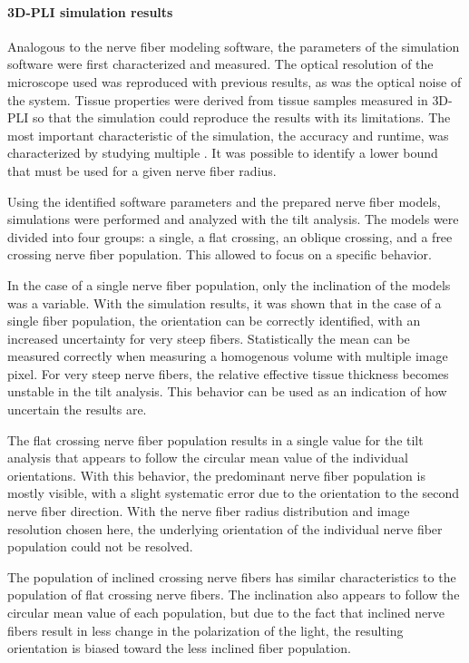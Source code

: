 \paragraph{\acs{3D-PLI} simulation results}
%
Analogous to the nerve fiber modeling software, the parameters of the simulation software were first characterized and measured.
The optical resolution of the microscope used was reproduced with previous results, as was the optical noise of the system.
Tissue properties were derived from tissue samples measured in \ac{3D-PLI} so that the simulation could reproduce the results with its limitations.
The most important characteristic of the simulation, the accuracy and runtime, was characterized by studying multiple \Voxelsize{}.
It was possible to identify a lower bound that must be used for a given nerve fiber radius.
\par
%
Using the identified software parameters and the prepared nerve fiber models, simulations were performed and analyzed with the tilt analysis.
The models were divided into four groups: a single, a flat crossing, an oblique crossing, and a free crossing nerve fiber population.
This allowed to focus on a specific behavior.
\par
%
In the case of a single nerve fiber population, only the inclination of the models was a variable.
With the simulation results, it was shown that in the case of a single fiber population, the orientation can be correctly identified, with an increased uncertainty for very steep fibers.
Statistically the mean can be measured correctly when measuring a homogenous volume with multiple image pixel.
For very steep nerve fibers, the relative effective tissue thickness becomes unstable in the tilt analysis.
This behavior can be used as an indication of how uncertain the results are.
\par
%
The flat crossing nerve fiber population results in a single value for the tilt analysis that appears to follow the circular mean value of the individual orientations.
With this behavior, the predominant nerve fiber population is mostly visible, with a slight systematic error due to the orientation to the second nerve fiber direction.
With the nerve fiber radius distribution and image resolution chosen here, the underlying orientation of the individual nerve fiber population could not be resolved.
\par
%
The population of inclined crossing nerve fibers has similar characteristics to the population of flat crossing nerve fibers.
The inclination also appears to follow the circular mean value of each population, but due to the fact that inclined nerve fibers result in less change in the polarization of the light, the resulting orientation is biased toward the less inclined fiber population.
